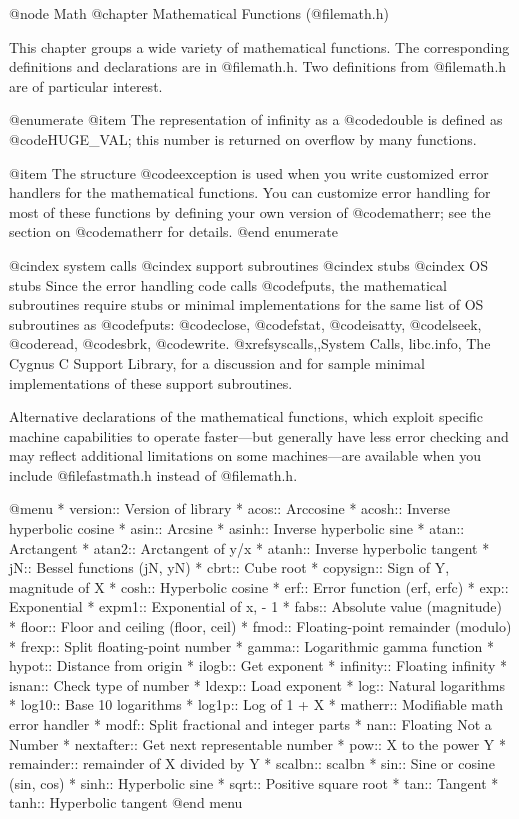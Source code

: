 @node Math
@chapter Mathematical Functions (@file{math.h})

This chapter groups a wide variety of mathematical functions.  The
corresponding definitions and declarations are in @file{math.h}.  
Two definitions from @file{math.h} are of particular interest.  

@enumerate
@item
The representation of infinity as a @code{double} is defined as
@code{HUGE_VAL}; this number is returned on overflow by many functions.

@item
The structure @code{exception} is used when you write customized error
handlers for the mathematical functions.  You can customize error
handling for most of these functions by defining your own version of
@code{matherr}; see the section on @code{matherr} for details.
@end enumerate

@cindex system calls
@cindex support subroutines
@cindex stubs
@cindex OS stubs
Since the error handling code calls @code{fputs}, the mathematical
subroutines require stubs or minimal implementations for the same list
of OS subroutines as @code{fputs}: @code{close}, @code{fstat},
@code{isatty}, @code{lseek}, @code{read}, @code{sbrk}, @code{write}.
@xref{syscalls,,System Calls, libc.info, The Cygnus C Support Library},
for a discussion and for sample minimal implementations of these support
subroutines.

Alternative declarations of the mathematical functions, which exploit
specific machine capabilities to operate faster---but generally have
less error checking and may reflect additional limitations on some
machines---are available when you include @file{fastmath.h} instead of
@file{math.h}.

@menu 
* version::	Version of library
* acos::	Arccosine
* acosh::	Inverse hyperbolic cosine
* asin::	Arcsine
* asinh::	Inverse hyperbolic sine
* atan::	Arctangent
* atan2::	Arctangent of y/x
* atanh::	Inverse hyperbolic tangent
* jN::	        Bessel functions  (jN, yN)
* cbrt::	Cube root
* copysign::	Sign of Y, magnitude of X
* cosh::	Hyperbolic cosine
* erf::		Error function  (erf, erfc)
* exp::		Exponential
* expm1::	Exponential of x, - 1
* fabs::	Absolute value (magnitude)
* floor::	Floor and ceiling  (floor, ceil)
* fmod::	Floating-point remainder (modulo)
* frexp::	Split floating-point number
* gamma::	Logarithmic gamma function
* hypot::	Distance from origin
* ilogb::	Get exponent
* infinity::	Floating infinity
* isnan::	Check type of number
* ldexp::	Load exponent
* log::		Natural logarithms
* log10::	Base 10 logarithms
* log1p::	Log of 1 + X
* matherr::	Modifiable math error handler
* modf::	Split fractional and integer parts
* nan::		Floating Not a Number
* nextafter::	Get next representable number
* pow::		X to the power Y
* remainder::	remainder of X divided by Y 
* scalbn::	scalbn
* sin::		Sine or cosine (sin, cos)
* sinh::	Hyperbolic sine
* sqrt::	Positive square root
* tan::		Tangent
* tanh::	Hyperbolic tangent
@end menu

